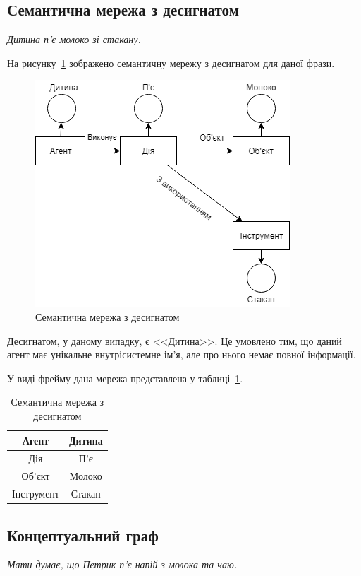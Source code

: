 \subsection{Семантична мережа з десигнатом}
\textit{Дитина п'є молоко зі стакану.}

На рисунку~\ref{fig:semantic_ext_ds} зображено семантичну мережу з десигнатом для даної фрази.

\begin{figure}[H]
    \centering
        \includegraphics[width=0.7\linewidth]{semantic_ext_ds}
    \caption{Семантична мережа з десигнатом}
    \label{fig:semantic_ext_ds}
\end{figure}

Десигнатом, у даному випадку, є <<Дитина>>. 
Це умовлено тим, що даний агент має унікальне внутрісистемне ім'я, але про нього немає повної інформації.

У виді фрейму дана мережа представлена у таблиці~\ref{tab:semantic_ext_ds}.

\begin{table}[H]
  \begin{tabular}{|c|c|}
    \hline
    Агент & Дитина \\ \hline
    Дія & П'є \\ \hline
    Об'єкт & Молоко \\ \hline
    Інструмент & Стакан \\ \hline
  \end{tabular}
  \caption{Семантична мережа з десигнатом}
  \label{tab:semantic_ext_ds}
\end{table}

\subsection{Концептуальний граф}
\textit{Мати думає, що Петрик п'є напій з молока та чаю.}

